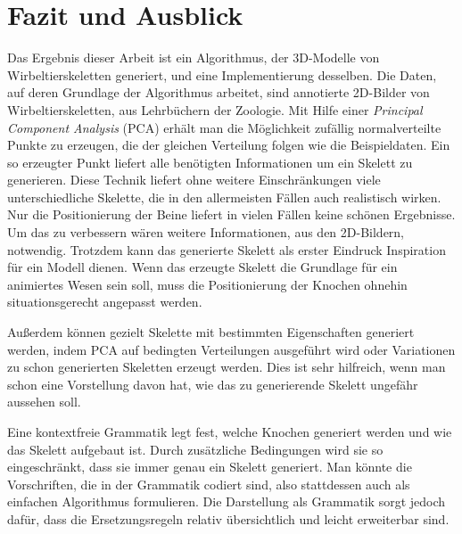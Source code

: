 \chapter{Fazit und Ausblick}
\label{chapter:conclusion}

% 
% 

Das Ergebnis dieser Arbeit ist ein Algorithmus, der 3D-Modelle von Wirbeltierskeletten generiert, und eine Implementierung desselben. Die Daten, auf deren Grundlage der Algorithmus arbeitet, sind annotierte 2D-Bilder von Wirbeltierskeletten, \zb aus Lehrbüchern der Zoologie. 
Mit Hilfe einer \emph{Principal Component Analysis} (PCA) erhält man die Möglichkeit zufällig normalverteilte Punkte zu erzeugen, die der gleichen Verteilung folgen wie die Beispieldaten.
Ein so erzeugter Punkt liefert alle benötigten Informationen um ein Skelett zu generieren.
Diese Technik liefert ohne weitere Einschränkungen viele unterschiedliche Skelette, die in den allermeisten Fällen auch realistisch wirken.\\
Nur die Positionierung der Beine liefert in vielen Fällen keine schönen Ergebnisse. Um das zu verbessern wären weitere Informationen, \zb aus den 2D-Bildern, notwendig. Trotzdem kann das generierte Skelett als erster Eindruck \bzw Inspiration für ein Modell dienen. Wenn das erzeugte Skelett die Grundlage für ein animiertes Wesen sein soll, muss die Positionierung der Knochen ohnehin situationsgerecht angepasst werden.

Außerdem können gezielt Skelette mit bestimmten Eigenschaften generiert werden, indem PCA auf bedingten Verteilungen ausgeführt wird oder Variationen zu schon generierten Skeletten erzeugt werden. Dies ist sehr hilfreich, wenn man schon eine Vorstellung davon hat, wie das zu generierende Skelett ungefähr aussehen soll.

Eine kontextfreie Grammatik legt fest, welche Knochen generiert werden und wie das Skelett aufgebaut ist.
Durch zusätzliche Bedingungen wird sie so eingeschränkt, dass sie immer genau ein Skelett generiert. Man könnte die Vorschriften, die in der Grammatik codiert sind, also stattdessen auch als einfachen Algorithmus formulieren.
Die Darstellung als Grammatik sorgt jedoch dafür, dass die Ersetzungsregeln relativ übersichtlich und leicht erweiterbar sind. 

